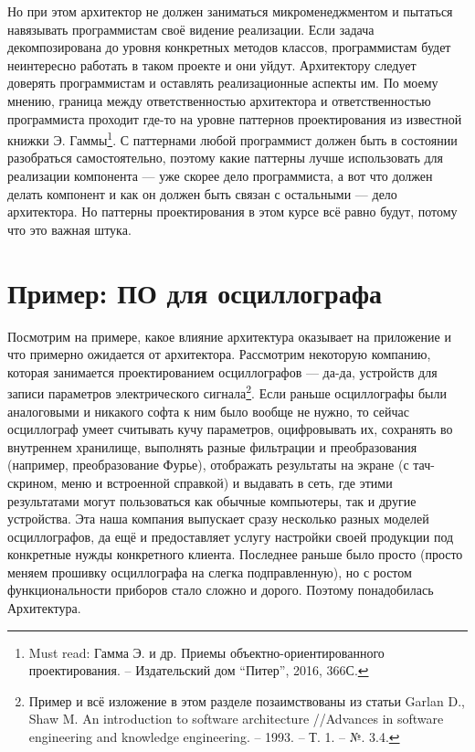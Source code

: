 \documentclass[a5paper]{article}
\begin{document}
Но при этом архитектор не должен заниматься микроменеджментом и пытаться навязывать программистам своё видение реализации. Если задача декомпозирована до уровня конкретных методов классов, программистам будет неинтересно работать в таком проекте и они уйдут. Архитектору следует доверять программистам и оставлять реализационные аспекты им. По моему мнению, граница между ответственностью архитектора и ответственностью программиста проходит где-то на уровне паттернов проектирования из известной книжки Э. Гаммы\footnote{Must read: Гамма Э. и др. Приемы объектно-ориентированного проектирования. -- Издательский дом ``Питер'', 2016, 366С.}. С паттернами любой программист должен быть в состоянии разобраться самостоятельно, поэтому какие паттерны лучше использовать для реализации компонента --- уже скорее дело программиста, а вот что должен делать компонент и как он должен быть связан с остальными --- дело архитектора. Но паттерны проектирования в этом курсе всё равно будут, потому что это важная штука.

\section{Пример: ПО для осциллографа}

Посмотрим на примере, какое влияние архитектура оказывает на приложение и что примерно ожидается от архитектора. Рассмотрим некоторую компанию, которая занимается проектированием осциллографов --- да-да, устройств для записи параметров электрического сигнала\footnote{Пример и всё изложение в этом разделе позаимствованы из статьи Garlan D., Shaw M. An introduction to software architecture //Advances in software engineering and knowledge engineering. -- 1993. -- Т. 1. -- №. 3.4.}. Если раньше осциллографы были аналоговыми и никакого софта к ним было вообще не нужно, то сейчас осциллограф умеет считывать кучу параметров, оцифровывать их, сохранять во внутреннем хранилище, выполнять разные фильтрации и преобразования (например, преобразование Фурье), отображать результаты на экране (с тач-скрином, меню и встроенной справкой) и выдавать в сеть, где этими результатами могут пользоваться как обычные компьютеры, так и другие устройства. Эта наша компания выпускает сразу несколько разных моделей осциллографов, да ещё и предоставляет услугу настройки своей продукции под конкретные нужды конкретного клиента. Последнее раньше было просто (просто меняем прошивку осциллографа на слегка подправленную), но с ростом функциональности приборов стало сложно и дорого. Поэтому понадобилась Архитектура.
\end{document}
